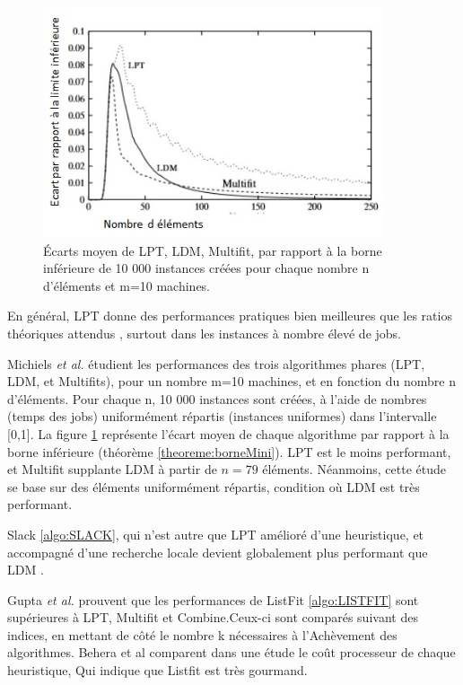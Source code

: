 \documentclass[a4paper,12pt]{report}
\theoremstyle{plain}				%
\theoremstyle{definition}				%
\begin{document}
\begin{figure}
\centering
\includegraphics[width=10cm,height=6.80cm]
{Biblio_PCmax_Rendu_CompborneInf_LPT_LDM_MULTIFIT.jpg}
\caption{Écarts moyen de LPT, LDM, Multifit, par rapport à la borne inférieure de  10 000 instances créées pour chaque nombre n d'éléments et m=10 machines.}
\label{comparaison:LPTLDMMFBorneInf}
\end{figure}

En général, LPT donne des performances pratiques bien meilleures que les ratios théoriques attendus \cite{della2018longest}, surtout dans les instances à nombre élevé de jobs. 

Michiels \emph{et al.} \citep{michiels2003performance} étudient les performances des trois algorithmes phares (LPT, LDM, et Multifits), pour un nombre m=10 machines, et en fonction du nombre n d'éléments. Pour chaque n, 10 000 instances sont créées, à l'aide de nombres (temps des jobs) uniformément répartis (instances uniformes) dans l'intervalle [0,1]. La figure \ref{comparaison:LPTLDMMFBorneInf} représente l'écart moyen de chaque algorithme 
par rapport à la borne inférieure (théorème \ref{theoreme:borneMini}). 
LPT est le moins performant, et Multifit supplante LDM à partir de $n=79$ éléments. Néanmoins, cette étude se base sur des éléments uniformément répartis, condition où LDM est très performant.

Slack \ref{algo:SLACK}, qui n'est autre que LPT amélioré d'une heuristique, et accompagné d'une recherche locale devient globalement plus performant que LDM \cite{della2018longest}.

Gupta \emph{et al.} prouvent que les performances de ListFit \ref{algo:LISTFIT} sont supérieures à LPT, Multifit et Combine.Ceux-ci sont comparés \cite{gupta2001listfit} \cite{lee1988multiprocessor} suivant des indices, en mettant de côté le nombre  k nécessaires à l’Achèvement des algorithmes. Behera et al \cite{behera2012comparison} comparent dans une étude le coût processeur de chaque heuristique, Qui indique que Listfit est très gourmand.
\end{document}
